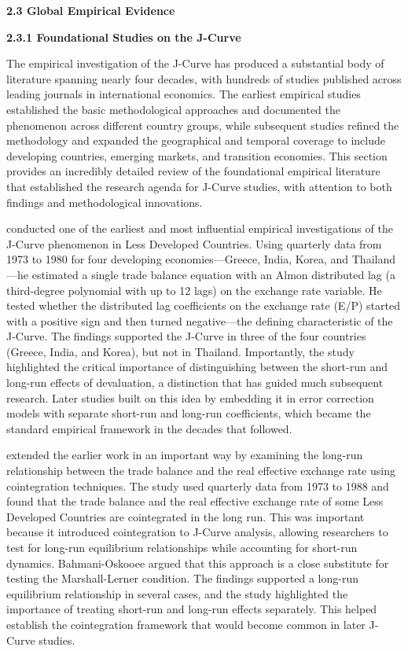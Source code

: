 \documentclass[12pt]{article}
\begin{document}
\vspace{0.5cm}
\noindent\textbf{2.3 Global Empirical Evidence}

\noindent\textbf{2.3.1 Foundational Studies on the J-Curve}

The empirical investigation of the J-Curve has produced a substantial body of literature spanning nearly four decades, with hundreds of studies published across leading journals in international economics. The earliest empirical studies established the basic methodological approaches and documented the phenomenon across different country groups, while subsequent studies refined the methodology and expanded the geographical and temporal coverage to include developing countries, emerging markets, and transition economies. This section provides an incredibly detailed review of the foundational empirical literature that established the research agenda for J-Curve studies, with attention to both findings and methodological innovations.

\textcite{Bahmani-Oskooee1985-jx} conducted one of the earliest and most influential empirical investigations of the J-Curve phenomenon in Less Developed Countries. Using quarterly data from 1973 to 1980 for four developing economies—Greece, India, Korea, and Thailand—he estimated a single trade balance equation with an Almon distributed lag (a third-degree polynomial with up to 12 lags) on the exchange rate variable. He tested whether the distributed lag coefficients on the exchange rate (E/P) started with a positive sign and then turned negative—the defining characteristic of the J-Curve. The findings supported the J-Curve in three of the four countries (Greece, India, and Korea), but not in Thailand. Importantly, the study highlighted the critical importance of distinguishing between the short-run and long-run effects of devaluation, a distinction that has guided much subsequent research. Later studies built on this idea by embedding it in error correction models with separate short-run and long-run coefficients, which became the standard empirical framework in the decades that followed.

\textcite{Bahmani-Oskooee1991-or} extended the earlier work in an important way by examining the long-run relationship between the trade balance and the real effective exchange rate using cointegration techniques. The study used quarterly data from 1973 to 1988 and found that the trade balance and the real effective exchange rate of some Less Developed Countries are cointegrated in the long run. This was important because it introduced cointegration to J-Curve analysis, allowing researchers to test for long-run equilibrium relationships while accounting for short-run dynamics. Bahmani-Oskooee argued that this approach is a close substitute for testing the Marshall-Lerner condition. The findings supported a long-run equilibrium relationship in several cases, and the study highlighted the importance of treating short-run and long-run effects separately. This helped establish the cointegration framework that would become common in later J-Curve studies.
\end{document}
